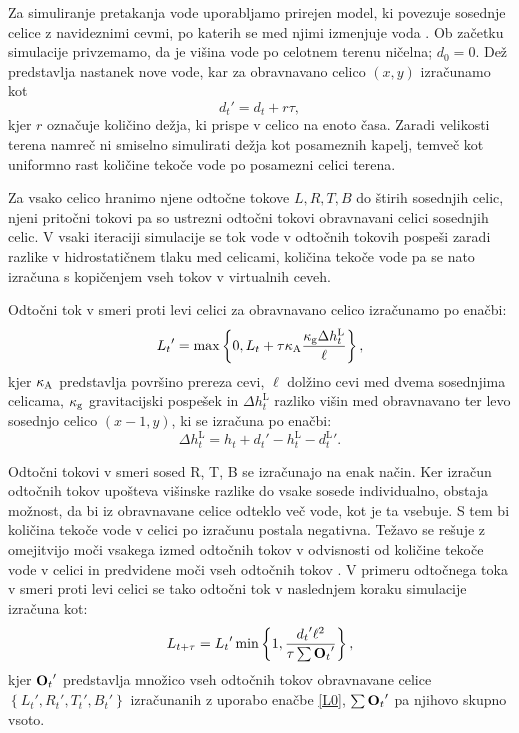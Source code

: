 \documentclass[9pt]{style/friteza}
\begin{document}
Za simuliranje pretakanja vode uporabljamo prirejen model, ki povezuje sosednje celice z navideznimi cevmi, po katerih se med njimi izmenjuje voda \cite{splashing_fluids_95}. Ob začetku simulacije privzemamo, da je višina vode po celotnem terenu ničelna; $d_0=0$. Dež predstavlja nastanek nove vode, kar za obravnavano celico $(x,y)$ izračunamo kot
\begin{equation} \label{eq:new_water}
{d_{t}}' = d_t + r \tau,
\end{equation}
kjer $r$ označuje količino dežja, ki prispe v celico na enoto časa. Zaradi velikosti terena namreč ni smiselno simulirati dežja kot posameznih kapelj, temveč kot uniformno rast količine tekoče vode po posamezni celici terena.

Za vsako celico hranimo njene odtočne tokove $L, R, T, B$ do štirih sosednjih celic, njeni pritočni tokovi pa so ustrezni odtočni tokovi obravnavani celici sosednjih celic. V vsaki iteraciji simulacije se tok vode v odtočnih tokovih pospeši zaradi razlike v hidrostatičnem tlaku med celicami, količina tekoče vode pa se nato izračuna s kopičenjem vseh tokov v virtualnih ceveh.

Odtočni tok v smeri proti levi celici za obravnavano celico izračunamo po enačbi:
\begin{equation} \label{L0}
{L_{t}}' = \max\left\{0, L_t + \tau{\ensuremath{\kappa_\mathrm{A}}} \frac{{\kappa_\mathrm{g}} \Delta h^\mathrm{L}_t}{\ell} \right\},
\end{equation}
kjer ${\kappa_\mathrm{A}}$ predstavlja površino prereza cevi, $\ell$ dolžino cevi med dvema sosednjima celicama, ${\kappa_\mathrm{g}}$ gravitacijski pospešek in $\Delta h^\mathrm{L}_t$ razliko višin med obravnavano ter levo sosednjo celico $(x-1, y)$, ki se izračuna po enačbi:
\begin{equation}
\Delta h^\mathrm{L}_t = h_t + {d_{t}}' - h^\mathrm{L}_t - {d^\mathrm{L}_{t}}'.
\end{equation}

Odtočni tokovi v smeri sosed R, T, B se izračunajo na enak način. Ker izračun odtočnih tokov upošteva višinske razlike do vsake sosede individualno, obstaja možnost, da bi iz obravnavane celice odteklo več vode, kot je ta vsebuje. S tem bi količina tekoče vode v celici po izračunu postala negativna. Težavo se rešuje z omejitvijo moči vsakega izmed odtočnih tokov v odvisnosti od količine tekoče vode v celici in predvidene moči vseh odtočnih tokov \cite{benevs_fast_gpu_07,maske_2013}. V primeru odtočnega toka v smeri proti levi celici se tako odtočni tok v naslednjem koraku simulacije izračuna kot:
\begin{equation}
L_{t+\tau} = {L_t}' \min\left\{1, \frac{{d_{t}}' \ell^2}{\tau \sum {\ensuremath{\mathbf{O}}_t}'}\right\},
\end{equation}
kjer ${\mathbf{O}_t}'$ predstavlja množico vseh odtočnih tokov obravnavane celice $\left\{{L_t}', {R_t}', {T_t}', {B_t}'\right\}$ izračunanih z uporabo enačbe \eqref{L0}, $\sum {\ensuremath{\mathbf{O}}_t}'$ pa njihovo skupno vsoto.
\end{document}
